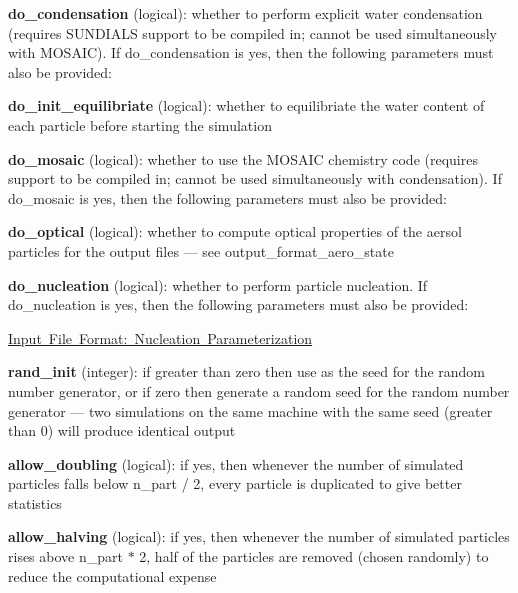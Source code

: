 \begin{DoxyItemize}
\begin{DoxyItemize}
\end{DoxyItemize}
\item {\bfseries do\+\_\+condensation} (logical)\+: whether to perform explicit water condensation (requires S\+U\+N\+D\+I\+A\+LS support to be compiled in; cannot be used simultaneously with M\+O\+S\+A\+IC). If {\ttfamily do\+\_\+condensation} is {\ttfamily yes}, then the following parameters must also be provided\+:
\begin{DoxyItemize}
\item {\bfseries do\+\_\+init\+\_\+equilibriate} (logical)\+: whether to equilibriate the water content of each particle before starting the simulation
\end{DoxyItemize}
\item {\bfseries do\+\_\+mosaic} (logical)\+: whether to use the M\+O\+S\+A\+IC chemistry code (requires support to be compiled in; cannot be used simultaneously with condensation). If {\ttfamily do\+\_\+mosaic} is {\ttfamily yes}, then the following parameters must also be provided\+:
\begin{DoxyItemize}
\item {\bfseries do\+\_\+optical} (logical)\+: whether to compute optical properties of the aersol particles for the output files --- see output\+\_\+format\+\_\+aero\+\_\+state
\end{DoxyItemize}
\item {\bfseries do\+\_\+nucleation} (logical)\+: whether to perform particle nucleation. If {\ttfamily do\+\_\+nucleation} is {\ttfamily yes}, then the following parameters must also be provided\+:
\begin{DoxyItemize}
\item \mbox{\hyperlink{input_format_nucleate}{Input File Format\+: Nucleation Parameterization}}
\end{DoxyItemize}
\item {\bfseries rand\+\_\+init} (integer)\+: if greater than zero then use as the seed for the random number generator, or if zero then generate a random seed for the random number generator --- two simulations on the same machine with the same seed (greater than 0) will produce identical output
\item {\bfseries allow\+\_\+doubling} (logical)\+: if {\ttfamily yes}, then whenever the number of simulated particles falls below {\ttfamily n\+\_\+part / 2}, every particle is duplicated to give better statistics
\item {\bfseries allow\+\_\+halving} (logical)\+: if {\ttfamily yes}, then whenever the number of simulated particles rises above {\ttfamily n\+\_\+part $\ast$ 2}, half of the particles are removed (chosen randomly) to reduce the computational expense

\end{DoxyItemize}

